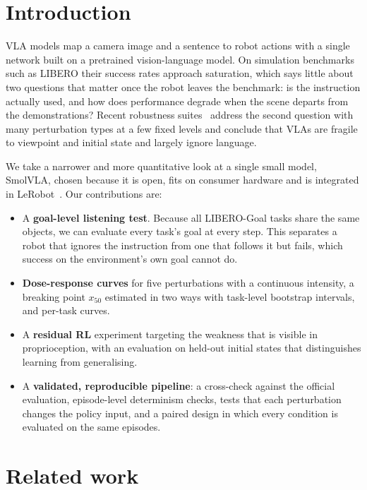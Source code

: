 \documentclass[10pt,twocolumn,letterpaper]{article}
\begin{document}
\section{Introduction}
VLA models map a camera image and a sentence to robot actions with a single network built on a
pretrained vision-language model. On simulation benchmarks such as LIBERO their success rates approach
saturation, which says little about two questions that matter once the robot leaves the benchmark: is
the instruction actually used, and how does performance degrade when the scene departs from the
demonstrations? Recent robustness suites~\citep{fei2025liberoplus,zhou2025liberopro} address the second
question with many perturbation types at a few fixed levels and conclude that VLAs are fragile to
viewpoint and initial state and largely ignore language.

We take a narrower and more quantitative look at a single small model, SmolVLA, chosen because it is open,
fits on consumer hardware and is integrated in LeRobot~\citep{cadene2024lerobot}. Our contributions are:
\begin{itemize}
  \item A \textbf{goal-level listening test}. Because all LIBERO-Goal tasks share the same objects, we
  can evaluate every task's goal at every step. This separates a robot that ignores the instruction from
  one that follows it but fails, which success on the environment's own goal cannot do.
  \item \textbf{Dose-response curves} for five perturbations with a continuous intensity, a breaking
  point $x_{50}$ estimated in two ways with task-level bootstrap intervals, and per-task curves.
  \item A \textbf{residual RL} experiment targeting the weakness that is visible in proprioception, with
  an evaluation on held-out initial states that distinguishes learning from generalising.
  \item A \textbf{validated, reproducible pipeline}: a cross-check against the official evaluation,
  episode-level determinism checks, tests that each perturbation changes the policy input, and a paired
  design in which every condition is evaluated on the same episodes.
\end{itemize}

\section{Related work}
\end{document}

